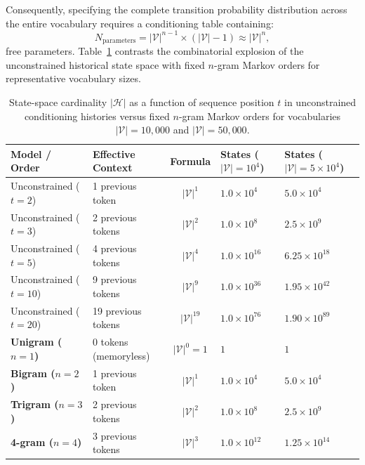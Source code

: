 \documentclass[../../main.tex]{subfiles}
\begin{document}
Consequently, specifying the complete transition probability distribution across the entire vocabulary requires a conditioning table containing:
\begin{equation}
N_{\text{parameters}} = |\mathcal{V}|^{n-1} \times (|\mathcal{V}| - 1) \approx |\mathcal{V}|^n,
\label{eq:parameters_ngram}
\end{equation}
free parameters. Table~\ref{tab:state_space_reduction} contrasts the combinatorial explosion of the unconstrained historical state space with fixed $n$-gram Markov orders for representative vocabulary sizes.

\begin{table}[htbp]
\centering
\small
\begin{tabularx}{\textwidth}{l l c >{\raggedleft\arraybackslash}X >{\raggedleft\arraybackslash}X}
\toprule
\textbf{Model / Order} & \textbf{Effective Context} & \textbf{Formula} & \textbf{States ($|\mathcal{V}| = 10^4$)} & \textbf{States ($|\mathcal{V}| = 5 \times 10^4$)} \\
\midrule
Unconstrained ($t=2$)  & 1 previous token   & $|\mathcal{V}|^1$       & $1.0 \times 10^4$    & $5.0 \times 10^4$    \\
Unconstrained ($t=3$)  & 2 previous tokens  & $|\mathcal{V}|^2$       & $1.0 \times 10^8$    & $2.5 \times 10^9$    \\
Unconstrained ($t=5$)  & 4 previous tokens  & $|\mathcal{V}|^4$       & $1.0 \times 10^{16}$ & $6.25 \times 10^{18}$ \\
Unconstrained ($t=10$) & 9 previous tokens  & $|\mathcal{V}|^9$       & $1.0 \times 10^{36}$ & $1.95 \times 10^{42}$ \\
Unconstrained ($t=20$) & 19 previous tokens & $|\mathcal{V}|^{19}$    & $1.0 \times 10^{76}$ & $1.90 \times 10^{89}$ \\
\midrule
\textbf{Unigram ($n=1$)} & 0 tokens (memoryless) & $|\mathcal{V}|^0 = 1$   & $1$                  & $1$                  \\
\textbf{Bigram ($n=2$)}  & 1 previous token      & $|\mathcal{V}|^1$       & $1.0 \times 10^4$    & $5.0 \times 10^4$    \\
\textbf{Trigram ($n=3$)} & 2 previous tokens     & $|\mathcal{V}|^2$       & $1.0 \times 10^8$    & $2.5 \times 10^9$    \\
\textbf{4-gram ($n=4$)}  & 3 previous tokens     & $|\mathcal{V}|^3$       & $1.0 \times 10^{12}$ & $1.25 \times 10^{14}$ \\
\bottomrule
\end{tabularx}
\caption{State-space cardinality $|\mathcal{H}|$ as a function of sequence position $t$ in unconstrained conditioning histories versus fixed $n$-gram Markov orders for vocabularies $|\mathcal{V}| = 10{,}000$ and $|\mathcal{V}| = 50{,}000$.}
\label{tab:state_space_reduction}
\end{table}
\end{document}
